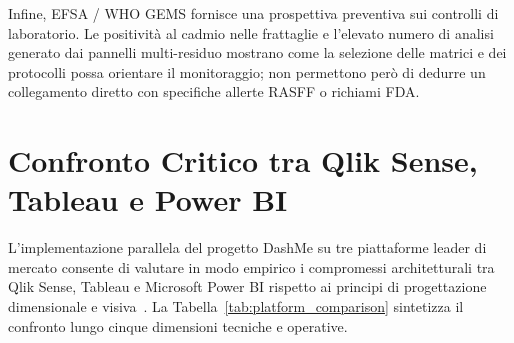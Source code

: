 Infine, EFSA / WHO GEMS fornisce una prospettiva preventiva sui controlli di laboratorio. Le positività al cadmio nelle frattaglie e l'elevato numero di analisi generato dai pannelli multi-residuo mostrano come la selezione delle matrici e dei protocolli possa orientare il monitoraggio; non permettono però di dedurre un collegamento diretto con specifiche allerte RASFF o richiami FDA.

\section{Confronto Critico tra Qlik Sense, Tableau e Power BI}
\label{sec:disc_platforms}

L'implementazione parallela del progetto DashMe su tre piattaforme leader di mercato consente di valutare in modo empirico i compromessi architetturali tra Qlik Sense, Tableau e Microsoft Power BI rispetto ai principi di progettazione dimensionale e visiva~\citep{kimball2013,few2013,sharda2020}. La Tabella~\ref{tab:platform_comparison} sintetizza il confronto lungo cinque dimensioni tecniche e operative.

